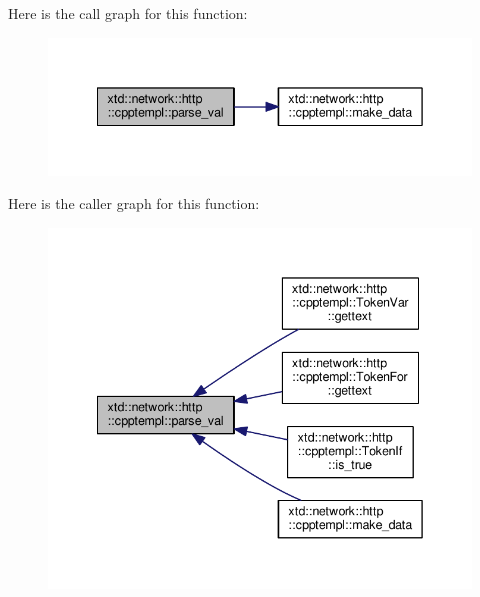 Here is the call graph for this function\+:
\nopagebreak
\begin{figure}[H]
\begin{center}
\leavevmode
\includegraphics[width=342pt]{namespacextd_1_1network_1_1http_1_1cpptempl_af79d10d06cd5bc9ce629bb2d21fbcfd6_cgraph}
\end{center}
\end{figure}




Here is the caller graph for this function\+:
\nopagebreak
\begin{figure}[H]
\begin{center}
\leavevmode
\includegraphics[width=342pt]{namespacextd_1_1network_1_1http_1_1cpptempl_af79d10d06cd5bc9ce629bb2d21fbcfd6_icgraph}
\end{center}
\end{figure}


